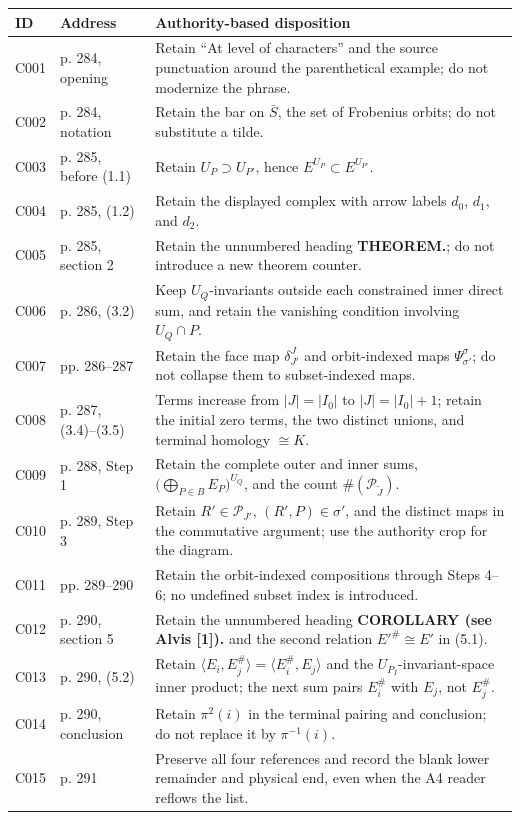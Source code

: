 \documentclass[10pt,a4paper]{article}
\begin{document}
\begin{tabularx}{\textwidth}{@{}P{12mm}P{22mm}Y@{}}
\toprule
\textbf{ID} & \textbf{Address} & \textbf{Authority-based disposition}\\
\midrule
C001 & p. 284, opening & Retain ``At level of characters'' and the source punctuation around the parenthetical example; do not modernize the phrase.\\
C002 & p. 284, notation & Retain the bar on $\bar S$, the set of Frobenius orbits; do not substitute a tilde.\\
C003 & p. 285, before (1.1) & Retain $U_P\supset U_{P'}$, hence $E^{U_P}\subset E^{U_{P'}}$.\\
C004 & p. 285, (1.2) & Retain the displayed complex with arrow labels $d_0$, $d_1$, and $d_2$.\\
C005 & p. 285, section 2 & Retain the unnumbered heading \textbf{THEOREM.}; do not introduce a new theorem counter.\\
C006 & p. 286, (3.2) & Keep $U_Q$-invariants outside each constrained inner direct sum, and retain the vanishing condition involving $U_Q\cap P$.\\
C007 & pp. 286--287 & Retain the face map $\delta_{J'}^J$ and orbit-indexed maps $\Psi_{\sigma'}^\sigma$; do not collapse them to subset-indexed maps.\\
C008 & p. 287, (3.4)--(3.5) & Terms increase from $|J|=|I_0|$ to $|J|=|I_0|+1$; retain the initial zero terms, the two distinct unions, and terminal homology $\cong K$.\\
C009 & p. 288, Step 1 & Retain the complete outer and inner sums, $\bigl(\bigoplus_{P\in B}E_P\bigr)^{U_Q}$, and the count $\#(\mathcal P_{\widetilde J})$.\\
C010 & p. 289, Step 3 & Retain $R'\in\mathcal P_{J'}$, $(R',P)\in\sigma'$, and the distinct maps in the commutative argument; use the authority crop for the diagram.\\
C011 & pp. 289--290 & Retain the orbit-indexed compositions through Steps 4--6; no undefined subset index is introduced.\\
C012 & p. 290, section 5 & Retain the unnumbered heading \textbf{COROLLARY (see Alvis [1]).} and the second relation $E'^{\#}\cong E'$ in (5.1).\\
C013 & p. 290, (5.2) & Retain $\langle E_i,E_j^{\#}\rangle=\langle E_i^{\#},E_j\rangle$ and the $U_{P_I}$-invariant-space inner product; the next sum pairs $E_i^{\#}$ with $E_j$, not $E_j^{\#}$.\\
C014 & p. 290, conclusion & Retain $\pi^2(i)$ in the terminal pairing and conclusion; do not replace it by $\pi^{-1}(i)$.\\
C015 & p. 291 & Preserve all four references and record the blank lower remainder and physical end, even when the A4 reader reflows the list.\\
\bottomrule
\end{tabularx}
\end{document}
